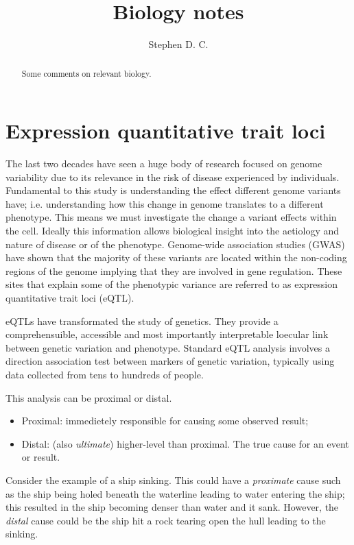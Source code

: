 \documentclass[a4paper,10pt]{article}
\title{Biology notes}
\author{Stephen D. C.}
\begin{document}
\maketitle

\begin{abstract}
Some comments on relevant biology.

\end{abstract}

\section{Expression quantitative trait loci}
The last two decades have seen a huge body of research focused on genome variability due to its 
relevance in the risk of disease experienced by individuals. Fundamental to this study is 
understanding the effect different genome variants have; i.e. understanding how this change 
in genome translates to a different phenotype. This means we must investigate the change a 
variant effects within the cell. Ideally this information allows biological insight into the 
aetiology and nature of disease or of the phenotype. Genome-wide association studies (GWAS) 
\cite{manolio2010genomewide} have shown that the majority of these variants are located within 
the non-coding regions of the genome implying that they are involved in gene regulation. These 
sites that explain some of the phenotypic variance are referred to as expression quantitative 
trait loci (eQTL).

eQTLs have transformated the study of genetics. They provide a comprehensuible, accessible and 
most importantly interpretable loecular link between genetic variation and phenotype. Standard 
eQTL analysis involves a direction association test between markers of genetic variation, 
typically using data collected from tens to hundreds of people.

This analysis can be proximal or distal.
\begin{itemize}
 \item Proximal: immedietely responsible for causing some observed result;
 \item Distal: (also \emph{ultimate}) higher-level than proximal. The true cause for an event or 
 result.
\end{itemize}
Consider the example of a ship sinking. This could have a \emph{proximate} cause such as the ship 
being holed beneath the waterline leading to water entering the ship; this resulted in the ship 
becoming denser than water and it sank. However, the \emph{distal} cause could be the ship hit a 
rock tearing open the hull leading to the sinking.
\end{document}
